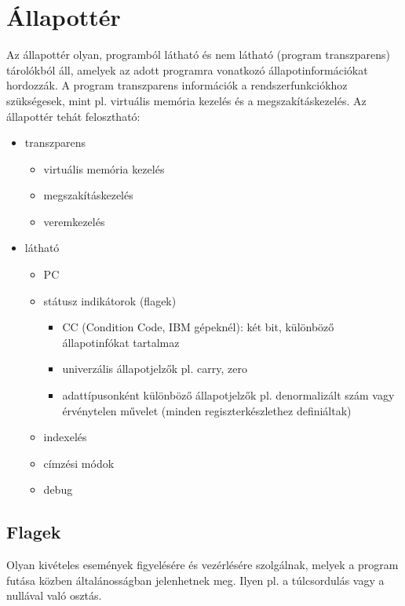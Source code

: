 \section{Állapottér}
Az állapottér olyan, programból látható és nem látható (program transzparens) tárolókból áll, amelyek az adott programra vonatkozó állapotinformációkat hordozzák.
A program transzparens információk a rendszerfunkciókhoz szükségesek, mint pl. virtuális memória kezelés és a megszakításkezelés.
Az állapottér tehát felosztható:
\begin{itemize}
    \item transzparens
    \begin{itemize}
        \item virtuális memória kezelés
        \item megszakításkezelés
        \item veremkezelés
    \end{itemize}
    \item látható
    \begin{itemize}
        \item PC
        \item státusz indikátorok (flagek)
        \begin{itemize}
            \item CC (Condition Code, IBM gépeknél): két bit, különböző állapotinfókat tartalmaz
            \item univerzális állapotjelzők pl. carry, zero
            \item adattípusonként különböző állapotjelzők pl. denormalizált szám vagy érvénytelen művelet (minden regiszterkészlethez definiáltak)
        \end{itemize}
        \item indexelés
        \item címzési módok
        \item debug
    \end{itemize}
\end{itemize}

\subsection{Flagek}
Olyan kivételes események figyelésére és vezérlésére szolgálnak, melyek a program futása közben általánosságban jelenhetnek meg.
Ilyen pl. a túlcsordulás vagy a nullával való osztás.

